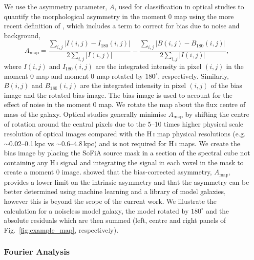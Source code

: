 \documentclass[fleqn,usenatbib]{mnras}
\begin{document}
We use the asymmetry parameter, $A$, \citep[first used by][]{Abraham1996} used for classification in optical studies to quantify the morphological asymmetry in the moment 0 map using the more recent definition of \cite{Conselice2000}, which includes a term to correct for bias due to noise and background,
\begin{equation}
	\displaystyle A_{\mathrm{map}}=\frac{\sum_{i,j}|I(i,j)-I_{180}(i,j)|}{2\sum_{i,j}|I(i,j)|}-\frac{\sum_{i,j}|B(i,j)-B_{180}(i,j)|}{2\sum_{i,j}|I(i,j)|},
	\label{equ:mom0_asym_corr}
\end{equation}
where $I(i,j)$ and $I_{180}(i,j)$ are the integrated intensity in pixel $(i,j)$ in the moment 0 map and moment 0 map rotated by $180^{\circ}$, respectively. Similarly, $B(i,j)$ and $B_{180}(i,j)$ are the integrated intensity in pixel $(i,j)$ of the bias image and the rotated bias image. The bias image is used to account for the effect of noise in the moment 0 map. We rotate the map about the flux centre of mass of the galaxy. Optical studies \citep[e.g.][]{Lotz2004} generally minimise $A_{\mathrm{map}}$ by shifting the centre of rotation around the central pixels due to the 5--10 times higher physical scale resolution of optical images compared with the H\,\textsc{i} map physical resolutions (e.g. $\sim0.02$--0.1\,kpc vs $\sim0.6$--4.8\,kpc) and is not required for H\,\textsc{i} maps. We create the bias image by placing the SoFiA source mask in a section of the spectral cube not containing any H\,\textsc{i} signal and integrating the signal in each voxel in the mask to create a moment 0 image. \cite{Giese2016} showed that the bias-corrected asymmetry, $A_{\mathrm{map}}$, provides a lower limit on the intrinsic asymmetry and that the asymmetry can be better determined using machine learning and a library of model galaxies, however this is beyond the scope of the current work. We illustrate the calculation for a noiseless model galaxy, the model rotated by $180^{\circ}$ and the absolute residuals which are then summed (left, centre and right panels of Fig.~\ref{fig:example_map}, respectively).



\subsubsection{Fourier Analysis}
\label{ss-sec:fourier}
\end{document}
